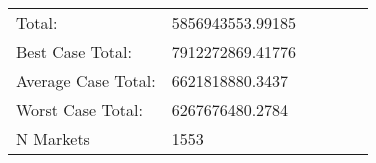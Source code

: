 \begin{tabular}[t]{llllll}
\midrule
\hspace{1em}Total: & 5856943553.99185 &  &  &  & \\
\hspace{1em}Best Case Total: & 7912272869.41776 &  &  &  & \\
\hspace{1em}Average Case Total: & 6621818880.3437 &  &  &  & \\
\hspace{1em}Worst Case Total: & 6267676480.2784 &  &  &  & \\
\hspace{1em}N Markets & 1553 &  &  &  & \\
\bottomrule
\end{tabular}
